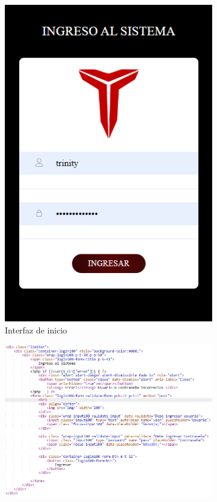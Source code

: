\begin{figure}[H]
    \begin{center}
        \begin{subfigure}{0.28\textwidth}
            \includegraphics[width=\linewidth]{./sistema/login.png}
            \caption{Interfaz de inicio}
        \end{subfigure}
        \hspace{0.05\textwidth}
        \begin{subfigure}{0.62\textwidth}
            \includegraphics[width=\linewidth]{./sistema/codigo_login.png}

\end{subfigure}
\end{center}
\end{figure}
